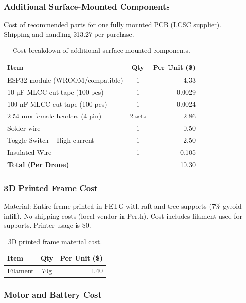 \subsubsection{Additional Surface-Mounted Components}

Cost of recommended parts for one fully mounted PCB (LCSC supplier). Shipping and handling \$13.27 per purchase.

\begin{table}[H]
\centering
\begin{tabular}{l c r}
\toprule
\textbf{Item} & \textbf{Qty} & \textbf{Per Unit (\$)} \\
\midrule
ESP32 module (WROOM/compatible) & 1 & 4.33 \\
10 µF MLCC cut tape (100 pcs) & 1 & 0.0029 \\
100 nF MLCC cut tape (100 pcs) & 1 & 0.0024 \\
2.54 mm female headers (4 pin) & 2 sets & 2.86 \\
Solder wire & 1 & 0.50 \\
Toggle Switch – High current & 1 & 2.50 \\
Insulated Wire & 1 & 0.105 \\
\midrule
\textbf{Total (Per Drone)} & & 10.30 \\
\bottomrule
\end{tabular}
\caption{Cost breakdown of additional surface-mounted components.}
\end{table}

\subsubsection{3D Printed Frame Cost}

Material: Entire frame printed in PETG with raft and tree supports (7\% gyroid infill). No shipping costs (local vendor in Perth). Cost includes filament used for supports. Printer usage is \$0.

\begin{table}[H]
\centering
\begin{tabular}{l c r}
\toprule
\textbf{Item} & \textbf{Qty} & \textbf{Per Unit (\$)} \\
\midrule
Filament & 70g & 1.40 \\
\bottomrule
\end{tabular}
\caption{3D printed frame material cost.}
\end{table}

\subsubsection{Motor and Battery Cost}

